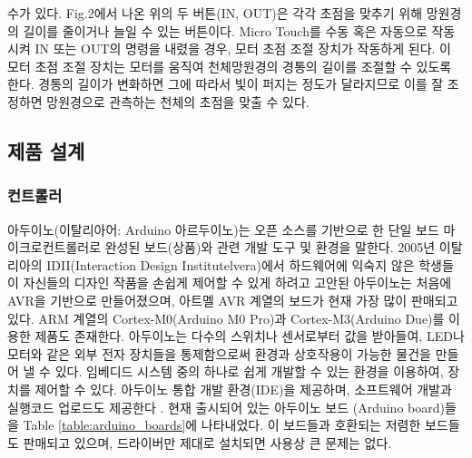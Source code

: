 수가 있다. Fig.2에서 나온 위의 두 버튼(IN, OUT)은 각각 초점을 맞추기 위해 망원경의 길이를 줄이거나 늘일 수 있는 버튼이다. Micro Touch를 수동 혹은 자동으로 작동시켜 IN 또는 OUT의 명령을 내렸을 경우, 모터 초점 조절 장치가 작동하게 된다. 이 모터 초점 조절 장치는 모터를 움직여 천체망원경의 경통의 길이를 조절할 수 있도록 한다. 경통의 길이가 변화하면 그에 따라서 빛이 퍼지는 정도가 달라지므로 이를 잘 조정하면 망원경으로 관측하는 천체의 초점을 맞출 수 있다.

\subsection{제품 설계}

\subsubsection{컨트롤러}

아두이노(이탈리아어: Arduino 아르두이노)는 오픈 소스를 기반으로 한 단일 보드 마이크로컨트롤러로 완성된 보드(상품)와 관련 개발 도구 및 환경을 말한다. 2005년 이탈리아의 IDII(Interaction Design Institutelvera)에서 하드웨어에 익숙지 않은 학생들이 자신들의 디자인 작품을 손쉽게 제어할 수 있게 하려고 고안된 아두이노는 처음에 AVR을 기반으로 만들어졌으며, 아트멜 AVR 계열의 보드가 현재 가장 많이 판매되고 있다. ARM 계열의 Cortex-M0(Arduino M0 Pro)과 Cortex-M3(Arduino Due)를 이용한 제품도 존재한다. 아두이노는 다수의 스위치나 센서로부터 값을 받아들여, LED나 모터와 같은 외부 전자 장치들을 통제함으로써 환경과 상호작용이 가능한 물건을 만들어 낼 수 있다. 임베디드 시스템 중의 하나로 쉽게 개발할 수 있는 환경을 이용하여, 장치를 제어할 수 있다.
아두이노 통합 개발 환경(IDE)을 제공하며, 소프트웨어 개발과 실행코드 업로드도 제공한다 \cite{wiki-arduino}. 
현재 출시되어 있는 아두이노 보드 (Arduino board)들을 Table \ref{table:arduino_boards}에 나타내었다. 이 보드들과 호환되는 저렴한 보드들도 판매되고 있으며, 드라이버만 제대로 설치되면 사용상 큰 문제는 없다. 

